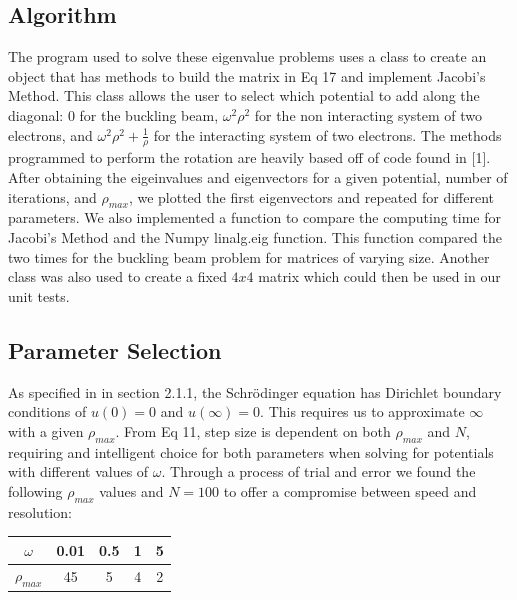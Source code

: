 \documentclass{emulateapj}
\begin{document}
\subsection{Algorithm}
The program used to solve these eigenvalue problems uses a class to create an object that has methods to build the matrix in Eq 17 and implement Jacobi's Method. This class allows the user to select which potential to add along the diagonal: 0 for the buckling beam, $\omega^2 \rho^2$ for the non interacting system of two electrons, and $\omega^2 \rho^2 + \frac{1}{\rho}$ for the interacting system of two electrons. The methods programmed to perform the rotation are heavily based off of code found in [1]. After obtaining the eigeinvalues and eigenvectors for a given potential, number of iterations, and $\rho_{max}$, we plotted the first eigenvectors and repeated for different parameters. We also implemented a function to compare the computing time for Jacobi's Method and the Numpy linalg.eig function. This function compared the two times for the buckling beam problem for matrices of varying size. Another class was also used to create a fixed $4x4$ matrix which could then be used in our unit tests.
\subsection{Parameter Selection}
As specified in in section 2.1.1, the Schrödinger equation has Dirichlet boundary conditions of $u(0)=0$ and $u(\infty)=0$. This requires us to approximate $\infty$ with a given $\rho_{max}$. From Eq 11, step size is dependent on both $\rho_{max}$ and $N$, requiring and intelligent choice for both parameters when solving for potentials with different values of $\omega$. Through a process of trial and error we found the following $\rho_{max}$ values and $N = 100$ to offer a compromise between speed and resolution:
\begin{center}
\begin{tabular}{ |c|c|c|c|c| }
\hline
$\omega$ & 0.01 & 0.5 & 1 & 5 \\
\hline
$\rho_{max}$ & 45 & 5 & 4 & 2 \\
\hline
\end{tabular}
\end{center}
\end{document}
